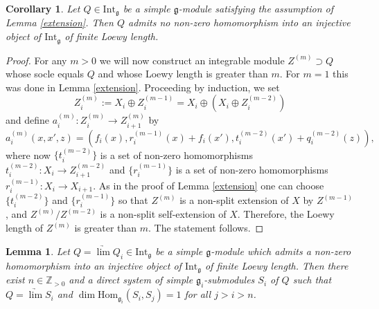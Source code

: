 \documentclass{birkmult}
\newcounter{theorem}
\newtheorem{lemma}[theo]{Lemma}
\newtheorem{corollary}[theo]{Corollary}
\newcommand {\ZZ} {\mathbb {Z}}
\renewcommand{\gg}{\mathfrak{g}}
\newcommand{\Int}{\mathrm{Int}}
\renewcommand{\hom}{\mathrm{Hom}}
\begin{document}
\begin{corollary}\label{ex} Let $Q\in\Int_\gg$ be a simple $\gg$-module
satisfying the assumption of Lemma \ref{extension}. Then $Q$ admits no
non-zero homomorphism into an injective object of $\Int_\gg$ of
finite Loewy length.
\end{corollary}
\begin{proof}For any $m>0$ we will now construct
an integrable module $Z^{(m)}\supset Q$ whose socle equals $Q$ and whose Loewy
length is greater than $m$. For $m=1$ this was done in Lemma
\ref{extension}. Proceeding by induction, we set
$$Z_i^{(m)}:=X_i\oplus Z_i^{(m-1)}=X_i\oplus(X_i\oplus Z_i^{(m-2)})$$
and define $a_i^{(m)}:Z_i^{(m)}\to Z_{i+1}^{(m)}$ by
$$a_i^{(m)}(x,x',z)=(f_i(x),r_i^{(m-1)}(x)+f_i(x'),t_i^{(m-2)}(x')+q_i^{(m-2)}(z)),$$
where now $\{t_i^{(m-2)}\}$ is a set of non-zero homomorphisms
$t_i^{(m-2)}:X_i\to Z_{i+1}^{(m-2)}$ and $\{r_i^{(m-1)}\}$ is a
set of non-zero homomorphisms $r_i^{(m-1)}:X_i\to X_{i+1}$. As in
the proof of Lemma \ref{extension} one can choose
$\{t_i^{(m-2)}\}$ and $\{r_i^{(m-1)}\}$ so that $Z^{(m)}$ is a
non-split extension of $X$ by $Z^{(m-1)}$, and $Z^{(m)}/Z^{(m-2)}$
is a non-split self-extension of $X$. Therefore, the Loewy length
of $Z^{(m)}$ is greater than $m$. The statement follows. 
\end{proof}
\begin{lemma}\label{locally} Let $Q=\underrightarrow{\lim} Q_i\in\Int_\gg$ 
be a simple $\gg$-module which admits a non-zero homomorphism into an 
injective object of $\Int_\gg$ of finite
Loewy length. Then there exist $n\in\ZZ_{>0}$ and a direct system
of simple $\gg_i$-submodules $S_i$ of $Q$ such that
$Q=\underrightarrow{\lim} S_i$ and $\dim\hom_{\gg_i}
(S_i,S_{j})=1$ for all $j>i>n$.
\end{lemma}
\end{document}
